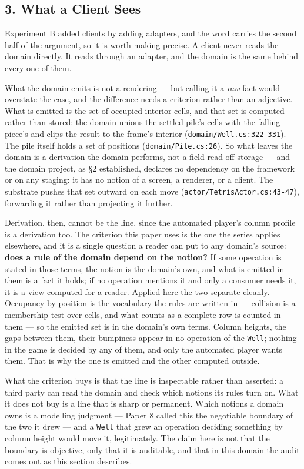 \documentclass[
]{article}
\begin{document}
\subsection{3. What a Client Sees}\label{what-a-client-sees}

Experiment B added clients by adding adapters, and the word carries the
second half of the argument, so it is worth making precise. A client
never reads the domain directly. It reads through an adapter, and the
domain is the same behind every one of them.

What the domain emits is not a rendering --- but calling it a \emph{raw}
fact would overstate the case, and the difference needs a criterion
rather than an adjective. What is emitted is the set of occupied
interior cells, and that set is computed rather than stored: the domain
unions the settled pile's cells with the falling piece's and clips the
result to the frame's interior (\texttt{domain/Well.cs:322-331}). The
pile itself holds a set of positions (\texttt{domain/Pile.cs:26}). So
what leaves the domain is a derivation the domain performs, not a field
read off storage --- and the domain project, as §2 established, declares
no dependency on the framework or on any staging: it has no notion of a
screen, a renderer, or a client. The substrate pushes that set outward
on each move (\texttt{actor/TetrisActor.cs:43-47}), forwarding it rather
than projecting it further.

Derivation, then, cannot be the line, since the automated player's
column profile is a derivation too. The criterion this paper uses is the
one the series applies elsewhere, and it is a single question a reader
can put to any domain's source: \textbf{does a rule of the domain depend
on the notion?} If some operation is stated in those terms, the notion
is the domain's own, and what is emitted in them is a fact it holds; if
no operation mentions it and only a consumer needs it, it is a view
computed for a reader. Applied here the two separate cleanly. Occupancy
by position is the vocabulary the rules are written in --- collision is
a membership test over cells, and what counts as a complete row is
counted in them --- so the emitted set is in the domain's own terms.
Column heights, the gaps between them, their bumpiness appear in no
operation of the \texttt{Well}; nothing in the game is decided by any of
them, and only the automated player wants them. That is why the one is
emitted and the other computed outside.

What the criterion buys is that the line is inspectable rather than
asserted: a third party can read the domain and check which notions its
rules turn on. What it does not buy is a line that is sharp or
permanent. Which notions a domain owns is a modelling judgment --- Paper
8 called this the negotiable boundary of the two it drew --- and a
\texttt{Well} that grew an operation deciding something by column height
would move it, legitimately. The claim here is not that the boundary is
objective, only that it is auditable, and that in this domain the audit
comes out as this section describes.
\end{document}

